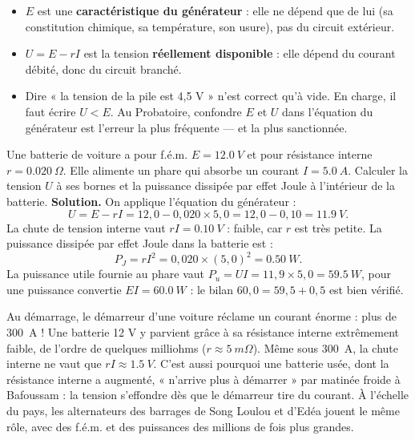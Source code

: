 \documentclass[11pt]{article}
\begin{document}
\begin{attention}
\begin{itemize}
\item $E$ est une \textbf{caractéristique du générateur} : elle ne dépend que de lui (sa constitution chimique, sa température, son usure), pas du circuit extérieur.
\item $U = E - rI$ est la tension \textbf{réellement disponible} : elle dépend du courant débité, donc du circuit branché.
\item Dire « la tension de la pile est 4,5 V » n'est correct qu'à vide. En charge, il faut écrire $U < E$. Au Probatoire, confondre $E$ et $U$ dans l'équation du générateur est l'erreur la plus fréquente — et la plus sanctionnée.
\end{itemize}
\end{attention}

\begin{exoresolu}
Une batterie de voiture a pour f.é.m. $E = \SI{12,0}{V}$ et pour résistance interne $r = \SI{0,020}{\Omega}$. Elle alimente un phare qui absorbe un courant $I = \SI{5,0}{A}$. Calculer la tension $U$ à ses bornes et la puissance dissipée par effet Joule à l'intérieur de la batterie.
\tcblower
\textbf{Solution.} On applique l'équation du générateur :
\[ U = E - rI = 12,0 - 0,020 \times 5,0 = 12,0 - 0,10 = \SI{11,9}{V}. \]
La chute de tension interne vaut $rI = \SI{0,10}{V}$ : faible, car $r$ est très petite.
La puissance dissipée par effet Joule dans la batterie est :
\[ P_J = rI^2 = 0,020 \times (5,0)^2 = \SI{0,50}{W}. \]
La puissance utile fournie au phare vaut $P_u = UI = 11,9 \times 5,0 = \SI{59,5}{W}$, pour une puissance convertie $EI = \SI{60,0}{W}$ : le bilan $60,0 = 59,5 + 0,5$ est bien vérifié.
\end{exoresolu}

\begin{savaistu}
Au démarrage, le démarreur d'une voiture réclame un courant énorme : plus de \SI{300}{A} ! Une batterie 12 V y parvient grâce à sa résistance interne extrêmement faible, de l'ordre de quelques milliohms ($r \approx \SI{5}{m\Omega}$). Même sous \SI{300}{A}, la chute interne ne vaut que $rI \approx \SI{1,5}{V}$. C'est aussi pourquoi une batterie usée, dont la résistance interne a augmenté, « n'arrive plus à démarrer » par matinée froide à Bafoussam : la tension s'effondre dès que le démarreur tire du courant. À l'échelle du pays, les alternateurs des barrages de Song Loulou et d'Edéa jouent le même rôle, avec des f.é.m. et des puissances des millions de fois plus grandes.
\end{savaistu}
\end{document}
